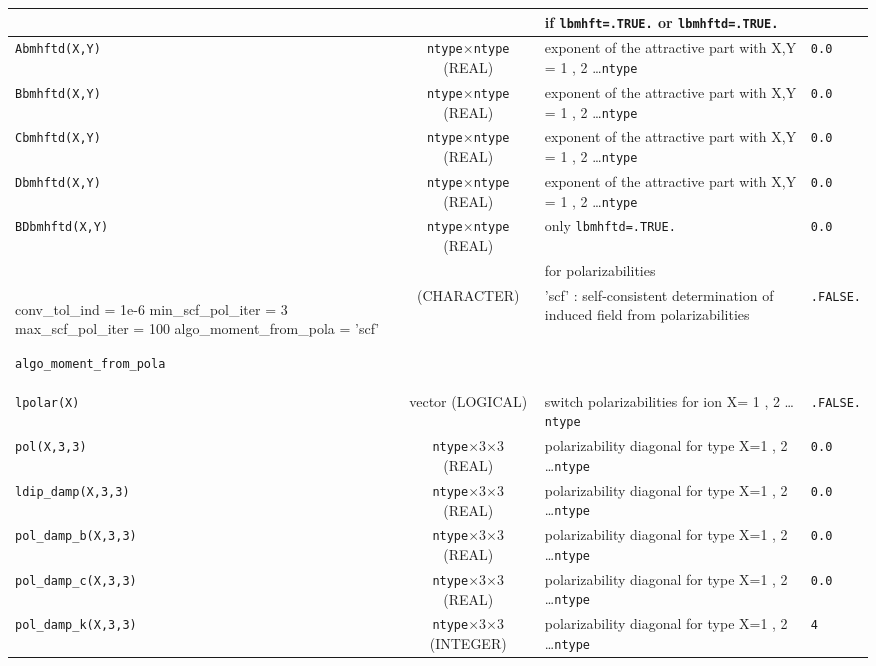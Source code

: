 \documentclass[a4paper]{article}
\begin{document}
\begin{longtable}{l|c|m{8cm}|m{2cm}}
\hline
\hline
\rule[-0.75cm]{0cm}{1.5cm}
 &  & if \verb?lbmhft=.TRUE.? or \verb?lbmhftd=.TRUE.? & \\
\hline
\rule[-0.75cm]{0cm}{1.5cm}
\verb?Abmhftd(X,Y)?    & \verb?ntype?$\times$\verb?ntype? (REAL)        & exponent of the attractive part with X,Y = 1 , 2 \ldots \verb?ntype?                & \verb?0.0? \\
\hline
\rule[-0.75cm]{0cm}{1.5cm}
\verb?Bbmhftd(X,Y)?    & \verb?ntype?$\times$\verb?ntype? (REAL)        & exponent of the attractive part with X,Y = 1 , 2 \ldots \verb?ntype?                & \verb?0.0? \\
\hline
\rule[-0.75cm]{0cm}{1.5cm}
\verb?Cbmhftd(X,Y)?    & \verb?ntype?$\times$\verb?ntype? (REAL)        & exponent of the attractive part with X,Y = 1 , 2 \ldots \verb?ntype?                & \verb?0.0? \\
\hline
\rule[-0.75cm]{0cm}{1.5cm}
\verb?Dbmhftd(X,Y)?    & \verb?ntype?$\times$\verb?ntype? (REAL)        & exponent of the attractive part with X,Y = 1 , 2 \ldots \verb?ntype?                & \verb?0.0? \\
\hline
\rule[-0.75cm]{0cm}{1.5cm}
\verb?BDbmhftd(X,Y)?    & \verb?ntype?$\times$\verb?ntype? (REAL)       & only \verb?lbmhftd=.TRUE.?                                                          & \verb?0.0? \\
\hline
\hline
\rule[-0.75cm]{0cm}{1.5cm}
 &  & for polarizabilities & \\

 conv_tol_ind  = 1e-6
  min_scf_pol_iter = 3
  max_scf_pol_iter = 100
  algo_moment_from_pola = 'scf'
\hline
\rule[-0.75cm]{0cm}{1.5cm}
\verb?algo_moment_from_pola? & (CHARACTER) & 'scf' : self-consistent determination of induced field from polarizabilities & \verb?.FALSE.?\\
\hline
\rule[-0.75cm]{0cm}{1.5cm}
\verb?lpolar(X)? & vector (LOGICAL) & switch polarizabilities for ion X= 1 , 2 \ldots \verb?ntype? & \verb?.FALSE.?\\
\hline
\rule[-0.75cm]{0cm}{1.5cm}
\verb?pol(X,3,3)? & \verb?ntype?$\times$3$\times$3 (REAL) & polarizability diagonal for type X=1 , 2 \ldots \verb?ntype? & \verb?0.0? \\
\hline
\rule[-0.75cm]{0cm}{1.5cm}
\verb?ldip_damp(X,3,3)? & \verb?ntype?$\times$3$\times$3 (REAL) & polarizability diagonal for type X=1 , 2 \ldots \verb?ntype? & \verb?0.0? \\
\hline
\rule[-0.75cm]{0cm}{1.5cm}
\verb?pol_damp_b(X,3,3)? & \verb?ntype?$\times$3$\times$3 (REAL) & polarizability diagonal for type X=1 , 2 \ldots \verb?ntype? & \verb?0.0? \\
\hline
\rule[-0.75cm]{0cm}{1.5cm}
\verb?pol_damp_c(X,3,3)? & \verb?ntype?$\times$3$\times$3 (REAL) & polarizability diagonal for type X=1 , 2 \ldots \verb?ntype? & \verb?0.0? \\
\hline
\rule[-0.75cm]{0cm}{1.5cm}
\verb?pol_damp_k(X,3,3)? & \verb?ntype?$\times$3$\times$3 (INTEGER) & polarizability diagonal for type X=1 , 2 \ldots \verb?ntype? & \verb?4? \\
\hline
\hline
\end{longtable}
\end{document}
